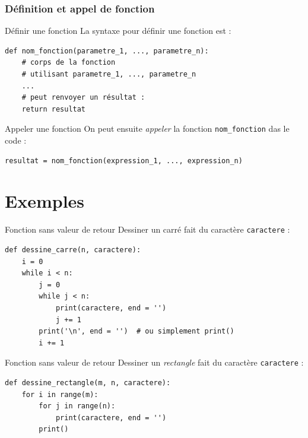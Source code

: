 \documentclass[x11names,svgnames]{beamer}
\begin{document}
\begin{frame}[fragile]
  \frametitle{Définition et appel de fonction}

  \begin{block}{Définir une fonction}
    \vspace{0pt}
    La syntaxe pour définir une fonction est :
    
\begin{verbatim}
def nom_fonction(parametre_1, ..., parametre_n):
    # corps de la fonction
    # utilisant parametre_1, ..., parametre_n
    ...
    # peut renvoyer un résultat :
    return resultat
\end{verbatim}
  \end{block}
  \pause
  \begin{block}{Appeler une fonction}
    \vspace{0pt}
    On peut ensuite \emph{appeler} la fonction \texttt{nom_fonction} das le code :
\begin{verbatim}
resultat = nom_fonction(expression_1, ..., expression_n)
\end{verbatim}
  \end{block}
\end{frame}

\section{Exemples}

\begin{frame}[fragile]{Fonction sans valeur de retour}
  Dessiner un carré fait du caractère \texttt{caractere} :
  \pause
\begin{verbatim}
def dessine_carre(n, caractere):
    i = 0
    while i < n:
        j = 0
        while j < n:
            print(caractere, end = '')
            j += 1
        print('\n', end = '')  # ou simplement print()
        i += 1
\end{verbatim}
\end{frame}

\begin{frame}[fragile]{Fonction sans valeur de retour}
  Dessiner un \emph{rectangle} fait du caractère \texttt{caractere} :
  \pause
\begin{verbatim}
def dessine_rectangle(m, n, caractere):
    for i in range(m):
        for j in range(n):
            print(caractere, end = '')
        print()
\end{verbatim}
\end{frame}
\end{document}
